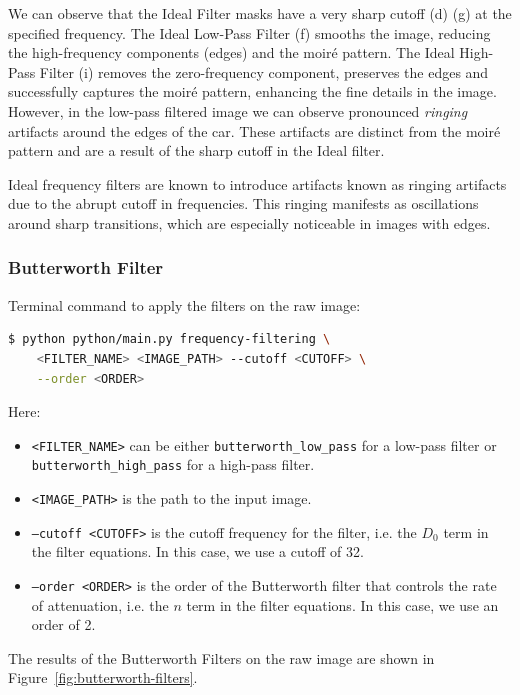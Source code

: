 \documentclass[a4paper,12pt]{article}
\begin{document}
We can observe that the Ideal Filter masks have a very sharp cutoff (d) (g) at the specified frequency. The Ideal Low-Pass Filter (f) smooths the image, reducing the high-frequency components (edges) and the moiré pattern. The Ideal High-Pass Filter (i) removes the zero-frequency component, preserves the edges and successfully captures the moiré pattern, enhancing the fine details in the image. However, in the low-pass filtered image we can observe pronounced \textit{ringing} artifacts around the edges of the car. These artifacts are distinct from the moiré pattern and are a result of the sharp cutoff in the Ideal filter.

Ideal frequency filters are known to introduce artifacts known as ringing artifacts due to the abrupt cutoff in frequencies. This ringing manifests as oscillations around sharp transitions, which are especially noticeable in images with edges.

\subsubsection{Butterworth Filter}

Terminal command to apply the filters on the raw image:

\begin{lstlisting}[language=bash]
$ python python/main.py frequency-filtering \
    <FILTER_NAME> <IMAGE_PATH> --cutoff <CUTOFF> \
    --order <ORDER>
\end{lstlisting}

Here:

\begin{itemize}
    \item \texttt{<FILTER\_NAME>} can be either \texttt{butterworth\_low\_pass} for a low-pass filter or \texttt{butterworth\_high\_pass} for a high-pass filter.
    \item \texttt{<IMAGE\_PATH>} is the path to the input image.
    \item \texttt{--cutoff <CUTOFF>} is the cutoff frequency for the filter, i.e. the \( D_0 \) term in the filter equations. In this case, we use a cutoff of 32.
    \item \texttt{--order <ORDER>} is the order of the Butterworth filter that controls the rate of attenuation, i.e. the \( n \) term in the filter equations. In this case, we use an order of 2.
\end{itemize}

The results of the Butterworth Filters on the raw image are shown in Figure~\ref{fig:butterworth-filters}.
\end{document}
